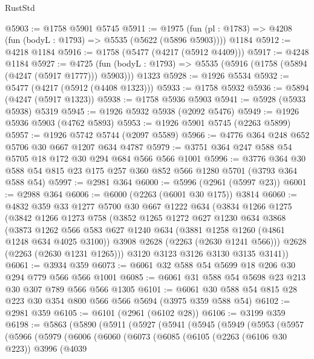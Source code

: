 \begin{lexlean}{RustStd}
\begin{coremodule}
{\begin{coremodule}
{{{{{{{{{{{{{{{@5903 := @1758 @5901 @5745
@5911 := @1975
    (fun (pl : @1783) => @4208 (fun (bodyL : @1793) => @5535 (@5622 (@5896 @5903))))
    @1184
@5912 := @4218 @1184
@5916 := @1758 (@5477 (@4217 (@5912 @4409)))
@5917 := @4248 @1184
@5927 := @4725
    (fun (bodyL : @1793) => @5535 (@5916 (@1758 (@5894 (@4247 (@5917 @1777))) @5903)))
    @1323
@5928 := @1926 @5534
@5932 := @5477 (@4217 (@5912 (@4408 @1323)))
@5933 := @1758 @5932
@5936 := @5894 (@4247 (@5917 @1323))
@5938 := @1758 @5936 @5903
@5941 := @5928 (@5933 @5938) @5319
@5945 := @1926 @5932 @5938 (@2092 @5476)
@5949 := @1926 @5936 @5903 (@4762 @5893)
@5953 := @1926 @5901 @5745 (@2263 @5899)
@5957 := @1926 @5742 @5744 (@2097 @5589)
@5966 := @4776 @364 @248 @652 @5706 @30 @667 @1207 @634 @4787
@5979 := @3751 @364 @247 @588 @54 @5705 @18 @172 @30 @294 @684 @566 @566 @1001
@5996 := @3776 @364 @30 @588 @54 @815 @23 @175 @257 @360 @852 @566 @1280 @5701 (@3793 @364 @588 @54)
@5997 := @2981 @364
@6000 := @5996 (@2961 (@5997 @23))
@6001 := @2988 @364
@6006 := @6000 (@2263 (@6001 @30 @175)) @3814
@6060 := @4832
    @359
    @33
    @1277
    @5700
    @30
    @667
    @1222
    @634
    (@3834
      @1266
      @1275
      (@3842
        @1266
        @1273
        @758
        (@3852
          @1265
          @1272
          @627
          @1230
          @634
          @3868
          (@3873
            @1262
            @566
            @583
            @627
            @1240
            @634
            (@3881 @1258 @1260 (@4861 @1248 @634 @4025 @3100))
            @3908
            @2628
            (@2263 (@2630 @1241 @566)))
          @2628
          (@2263 (@2630 @1231 @1265)))
        @3120
        @3123
        @3126
        @3130
        @3135
        @3141))
@6061 := @3934 @359
@6073 := @6061 @32 @588 @54 @5699 @18 @206 @30 @294 @779 @566 @566 @1001
@6085 := @6061 @31 @588 @54 @5698 @23 @213 @30 @307 @789 @566 @566 @1305
@6101 := @6061 @30 @588 @54 @815 @28 @223 @30 @354 @800 @566 @566 @5694 (@3975 @359 @588 @54)
@6102 := @2981 @359
@6105 := @6101 (@2961 (@6102 @28))
@6106 := @3199 @359
@6198 := @5863
    (@5890
      (@5911
        (@5927
          (@5941
            (@5945
              (@5949
                (@5953
                  (@5957
                    (@5966
                      (@5979
                        (@6006
                          (@6060
                            (@6073
                              (@6085
                                (@6105
                                  (@2263 (@6106 @30 @223))
                                  @3996
                                  (@4039
}}}}}}}}}}}}}}}
\end{coremodule}}
\end{coremodule}
\end{lexlean}
